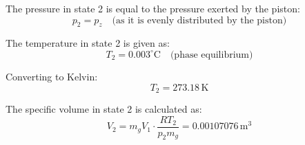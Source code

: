 The pressure in state 2 is equal to the pressure exerted by the piston:  
\[
p_2 = p_z \quad \text{(as it is evenly distributed by the piston)}
\]  

The temperature in state 2 is given as:  
\[
T_2 = 0.003^\circ\text{C} \quad \text{(phase equilibrium)}
\]  

Converting to Kelvin:  
\[
T_2 = 273.18 \, \text{K}
\]  

The specific volume in state 2 is calculated as:  
\[
V_2 = m_g V_1 \cdot \frac{R T_2}{p_2 m_g} = 0.00107076 \, \text{m}^3
\]